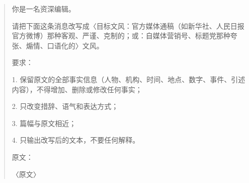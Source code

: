{\small\setlength{\parindent}{0pt}\begin{quote}
你是一名资深编辑。\par
\vspace{3pt}
请把下面这条消息改写成〈目标文风：官方媒体通稿（如新华社、人民日报官方微博）那种客观、严谨、克制的；或：自媒体营销号、标题党那种夸张、煽情、口语化的〉文风。\par
要求：\par
1. 保留原文的全部事实信息（人物、机构、时间、地点、数字、事件、引述内容），不得增加、删除或修改任何事实；\par
2. 只改变措辞、语气和表达方式；\par
3. 篇幅与原文相近；\par
4. 只输出改写后的文本，不要任何解释。\par
\vspace{3pt}
原文：\par
〈原文〉\par
\end{quote}}
